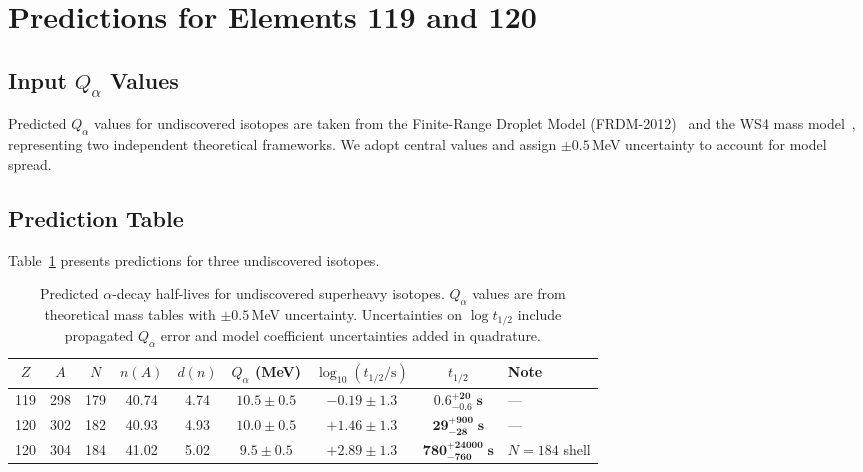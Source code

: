 \documentclass[12pt,a4paper,twocolumn]{revtex4-2}
\newcommand{\thalf}{t_{1/2}}
\newcommand{\Qalpha}{Q_\alpha}
\newcommand{\dn}{d(n)}
\begin{document}
\section{Predictions for Elements 119 and 120}
\label{sec:predictions}

\subsection{Input $\Qalpha$ Values}

Predicted $\Qalpha$ values for undiscovered isotopes are taken from
the Finite-Range Droplet Model (FRDM-2012)~\cite{FRDM2012} and
the WS4 mass model~\cite{WS4}, representing two independent
theoretical frameworks.  We adopt central values and assign
$\pm 0.5$\,MeV uncertainty to account for model spread.

\subsection{Prediction Table}

Table~\ref{tab:predictions} presents predictions for three
undiscovered isotopes.

\begin{table}[t]
\centering
\caption{Predicted $\alpha$-decay half-lives for undiscovered
  superheavy isotopes.  $\Qalpha$ values are from theoretical
  mass tables with $\pm 0.5$\,MeV uncertainty.  Uncertainties
  on $\log\thalf$ include propagated $\Qalpha$ error and model
  coefficient uncertainties added in quadrature.}
\label{tab:predictions}
\begin{tabular}{@{}ccccccccl@{}}
\toprule
$Z$ & $A$ & $N$ & $n(A)$ & $\dn$ &
  $\Qalpha$ (MeV) & $\log_{10}(\thalf/\text{s})$ &
  $\thalf$ & Note \\
\midrule
119 & 298 & 179 & 40.74 & 4.74 & $10.5 \pm 0.5$ &
  $-0.19 \pm 1.3$ & $\mathbf{0.6^{+20}_{-0.6}\;\text{s}}$ & --- \\[3pt]
120 & 302 & 182 & 40.93 & 4.93 & $10.0 \pm 0.5$ &
  $+1.46 \pm 1.3$ & $\mathbf{29^{+900}_{-28}\;\text{s}}$ & --- \\[3pt]
120 & 304 & 184 & 41.02 & 5.02 & $9.5 \pm 0.5$ &
  $+2.89 \pm 1.3$ & $\mathbf{780^{+24000}_{-760}\;\text{s}}$ &
  $N = 184$ shell \\
\bottomrule
\end{tabular}
\end{table}
\end{document}
